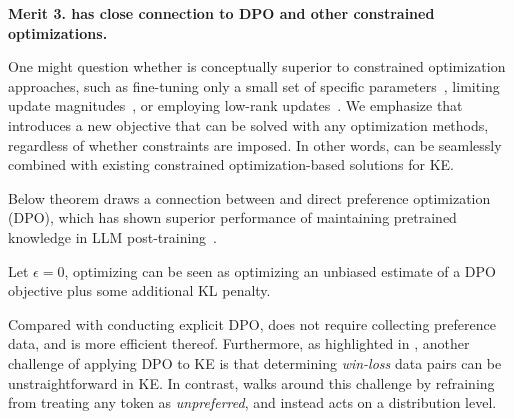 


\textbf{Merit 3. {\NAME} has close connection to DPO and other constrained optimizations.}

One might question whether {\NAME} is conceptually superior to constrained optimization approaches, such as fine-tuning only a small set of specific parameters~\citep{dong2022calibrating,dai2021knowledge}, limiting update magnitudes~\citep{zhu2020modifying}, or employing low-rank updates~\citep{hu2021lora}.
We emphasize that {\NAME} introduces a new objective that can be solved with any optimization methods, regardless of whether constraints are imposed. 
In other words, {\NAME} can be seamlessly combined with existing constrained optimization-based solutions for KE.


Below theorem  draws a connection between {\NAME} and direct preference optimization (DPO), which has shown superior performance of maintaining pretrained knowledge in LLM post-training~\citep{wang2023making}.
% 
\begin{theorem}
Let $\epsilon = 0$, 
optimizing {\NAME} can be seen as optimizing an unbiased estimate of a DPO objective plus some additional KL penalty. 
\end{theorem}
% 
Compared with conducting explicit DPO, {\NAME} does not require collecting preference data, and is more efficient thereof. 
Furthermore, as highlighted in \citet{rozner2024knowledge},
another challenge of applying DPO to KE is that determining \textit{win-loss} data pairs can be unstraightforward in KE. 
In contrast, {\NAME}  walks around this challenge by refraining from treating any token as \textit{unpreferred}, and instead acts on a distribution level. 


